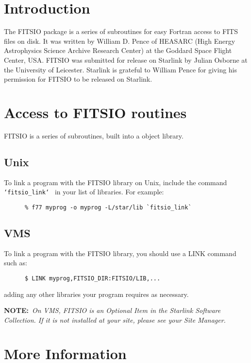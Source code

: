\section{Introduction}

The FITSIO package is a series of subroutines for easy Fortran access
to FITS files on disk. It was written by William D. Pence of HEASARC
(High Energy Astrophysics Science Archive Research Center) at the
Goddard Space Flight Center, USA.  FITSIO was submitted for release on
Starlink by Julian Osborne at the University of Leicester.  Starlink is
grateful to William Pence for giving his permission for FITSIO to be
released on Starlink.

\section {Access to FITSIO routines}

FITSIO is a series of subroutines, built into a object library.

\subsection {Unix}

To link a program with the FITSIO library on Unix, include the command
{\tt `fitsio\_link` } in your list of libraries. For example:

\begin{verbatim}
      % f77 myprog -o myprog -L/star/lib `fitsio_link`
\end{verbatim}

\subsection {VMS}

To link a program with the FITSIO library, you should use a LINK
command such as:

\begin{verbatim}
      $ LINK myprog,FITSIO_DIR:FITSIO/LIB,...
\end{verbatim}

adding any other libraries your program requires as necessary.

{\bf NOTE:}~{\em On VMS, FITSIO is an Optional Item in the Starlink
Software Collection. If it is not installed at your site, please see
your Site Manager.}

\section{More Information}


